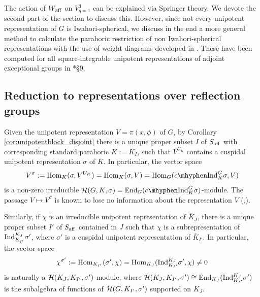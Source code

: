 The action of $W_{\mathrm{aff}}$ on $V^{\mathbf{1}}_{q=1}$ can be explained via Springer theory. We devote the second part of the section to discuss this. However, since not every unipotent representation of $G$ is Iwahori-spherical, we discuss in the end a more general method to calculate the parahoric restriction of non Iwahori-spherical representations with the use of weight diagrams developed in \cite{Reeder1997}. These have been computed for all square-integrable unipotent representations of adjoint exceptional groups in \cite{Reeder2000}*{\S 9}.

\subsection{Reduction to representations over reflection groups}

Given the unipotent representation $V=\pi(x,\phi)$ of $G$, by Corollary \ref{cor:unipotentblock_disjoint} there is a unique proper subset $I$ of $S_{\mathrm{aff}}$ with corresponding standard parahoric $K:=K_I$, such that $V^{U_K}$ contains a cuspidal unipotent representation $\sigma$ of $\overline{K}$. In particular, the vector space 
\begin{equation}\label{eqn:Vsigma}
    V^\sigma:=\Hom_K(\sigma,V^{U_K})=\Hom_K(\sigma,V)=\Hom_G(\cInd_K^G\sigma,V)    
\end{equation}
is a non-zero irreducible $\cH(G,K,\sigma)=\End_G(\cInd_K^G\sigma)$-module. The passage $V\mapsto V^\sigma$ is known to lose no information about the representation $V$ (\cite{BushnellKutzko1998},\cite{Lusztig1995}). %

Similarly, if $\chi$ is an irreducible unipotent representation of $\overline{K}_J$, there is a unique proper subset $I'$ of $S_{\mathrm{aff}}$ contained in $J$ such that $\chi$ is a subrepresentation of $\mathrm{Ind}_{K_{I'}}^{K_J}\sigma'$, where $\sigma'$ is a cuspidal unipotent representation of $\overline{K}_{I'}$. In particular, the vector space
$$\chi^{\sigma'}:=\mathrm{Hom}_{K_{I'}}(\sigma',\chi)=\mathrm{Hom}_{K_J}(\mathrm{Ind}_{K_{I'}}^{K_J}\sigma',\chi)\neq0$$
is naturally a $\mathcal{H}(K_J,K_{I'},\sigma')$-module, where $\mathcal{H}(K_J,K_{I'},\sigma')\cong\mathrm{End}_{K_J}(\mathrm{Ind}_{K_{I'}}^{K_J}\sigma')$ is the subalgebra of functions of $\mathcal{H}(G,K_{I'},\sigma')$ supported on $K_J$.

